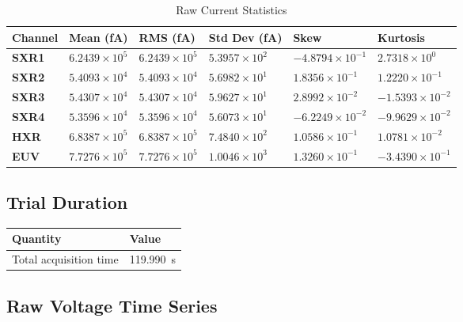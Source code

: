 \documentclass[12pt]{article}
\begin{document}
\begin{table}[H]
\centering
\caption{Raw Current Statistics} \label{tab:full_raw_stats}
\begin{tabular}{|C{0.9in}|C{1.08in}|C{1.08in}|C{1.08in}|C{1.08in}|C{1.08in}|}
\hline
\textbf{Channel} & \textbf{Mean (fA)} & \textbf{RMS (fA)} & \textbf{Std Dev (fA)} & \textbf{Skew} & \textbf{Kurtosis} \\
\hline
\textbf{SXR1} & $6.2439 \times 10^{5}$ & $6.2439 \times 10^{5}$ & $5.3957 \times 10^{2}$ & $-4.8794 \times 10^{-1}$ & $2.7318 \times 10^{0}$ \\
\hline
\textbf{SXR2} & $5.4093 \times 10^{4}$ & $5.4093 \times 10^{4}$ & $5.6982 \times 10^{1}$ & $1.8356 \times 10^{-1}$ & $1.2220 \times 10^{-1}$ \\
\hline
\textbf{SXR3} & $5.4307 \times 10^{4}$ & $5.4307 \times 10^{4}$ & $5.9627 \times 10^{1}$ & $2.8992 \times 10^{-2}$ & $-1.5393 \times 10^{-2}$ \\
\hline
\textbf{SXR4} & $5.3596 \times 10^{4}$ & $5.3596 \times 10^{4}$ & $5.6073 \times 10^{1}$ & $-6.2249 \times 10^{-2}$ & $-9.9629 \times 10^{-2}$ \\
\hline
\textbf{HXR} & $6.8387 \times 10^{5}$ & $6.8387 \times 10^{5}$ & $7.4840 \times 10^{2}$ & $1.0586 \times 10^{-1}$ & $1.0781 \times 10^{-2}$ \\
\hline
\textbf{EUV} & $7.7276 \times 10^{5}$ & $7.7276 \times 10^{5}$ & $1.0046 \times 10^{3}$ & $1.3260 \times 10^{-1}$ & $-3.4390 \times 10^{-1}$ \\
\hline
\end{tabular}
\end{table}


\subsection{Trial Duration}

\begin{center}
\begin{tabular}{|C{2in}|C{2in}|}
\hline
\textbf{Quantity} & \textbf{Value} \\
\hline
Total acquisition time & 119.990~s \\
\hline
\end{tabular}
\end{center}


\subsection{Raw Voltage Time Series}
\end{document}
